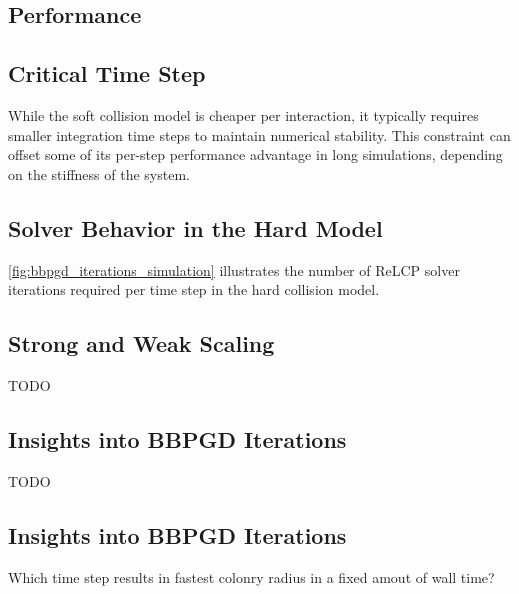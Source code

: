 \documentclass[conference]{IEEEtran}
\begin{document}
\subsection{Performance}
\cite{Yan2019}


\subsection{Critical Time Step}

While the soft collision model is cheaper per interaction, it typically requires smaller integration time steps
to maintain numerical stability. This constraint can offset some of its per-step performance advantage
in long simulations, depending on the stiffness of the system.

\subsection{Solver Behavior in the Hard Model}

\autoref{fig:bbpgd_iterations_simulation} illustrates the number of ReLCP solver iterations required per time step in the hard collision model.


\subsection{Strong and Weak Scaling}

TODO

\subsection{Insights into BBPGD Iterations}

TODO



\subsection{Insights into BBPGD Iterations}

Which time step results in fastest colonry radius in a fixed amout of wall time?
\end{document}
